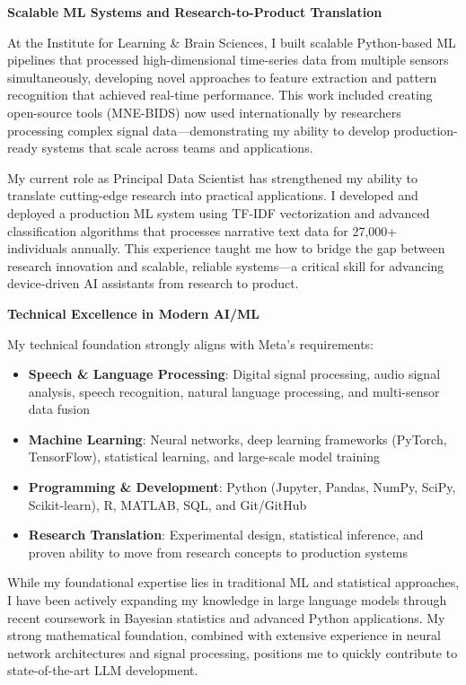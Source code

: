 \documentclass[10.5pt, letterpaper]{russell}
\begin{document}
\begin{cvletter}
  \textbf{Scalable ML Systems and Research-to-Product Translation}

  At the Institute for Learning \& Brain Sciences, I built scalable Python-based ML pipelines that processed high-dimensional time-series data from multiple sensors simultaneously, developing novel approaches to feature extraction and pattern recognition that achieved real-time performance. This work included creating open-source tools (MNE-BIDS) now used internationally by researchers processing complex signal data—demonstrating my ability to develop production-ready systems that scale across teams and applications.

  My current role as Principal Data Scientist has strengthened my ability to translate cutting-edge research into practical applications. I developed and deployed a production ML system using TF-IDF vectorization and advanced classification algorithms that processes narrative text data for 27,000+ individuals annually. This experience taught me how to bridge the gap between research innovation and scalable, reliable systems—a critical skill for advancing device-driven AI assistants from research to product.

  \textbf{Technical Excellence in Modern AI/ML}

  My technical foundation strongly aligns with Meta's requirements:

  \begin{itemize}
    \item \textbf{Speech \& Language Processing}: Digital signal processing, audio signal analysis, speech recognition, natural language processing, and multi-sensor data fusion
    \item \textbf{Machine Learning}: Neural networks, deep learning frameworks (PyTorch, TensorFlow), statistical learning, and large-scale model training
    \item \textbf{Programming \& Development}: Python (Jupyter, Pandas, NumPy, SciPy, Scikit-learn), R, MATLAB, SQL, and Git/GitHub
    \item \textbf{Research Translation}: Experimental design, statistical inference, and proven ability to move from research concepts to production systems
  \end{itemize}

  While my foundational expertise lies in traditional ML and statistical approaches, I have been actively expanding my knowledge in large language models through recent coursework in Bayesian statistics and advanced Python applications. My strong mathematical foundation, combined with extensive experience in neural network architectures and signal processing, positions me to quickly contribute to state-of-the-art LLM development.


\end{cvletter}
\end{document}
